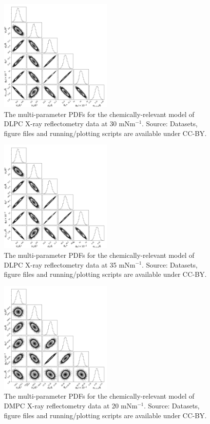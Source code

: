 \documentclass[11pt,a4paper]{paper}
\begin{document}
\begin{figure}[h]
	\centering
	\includegraphics[width=0.50\textwidth]{figures/dlpc3_all_corner}
	\caption{The multi-parameter PDFs for the chemically-relevant model of DLPC X-ray reflectometry data at 30 mNm$^{-1}$. Source: Datasets, figure files and running/plotting scripts are available under CC-BY.\cite{mccluskey_2018}}
	\label{fig:dlpc4}
\end{figure}
\begin{figure}
	\centering
	\includegraphics[width=0.50\textwidth]{figures/dlpc4_all_corner}
	\caption{The multi-parameter PDFs for the chemically-relevant model of DLPC X-ray reflectometry data at 35 mNm$^{-1}$. Source: Datasets, figure files and running/plotting scripts are available under CC-BY.\cite{mccluskey_2018}}
	\label{fig:dlpc5}
\end{figure}
\begin{figure}[h]
	\centering
	\includegraphics[width=0.50\textwidth]{figures/dmpc1_all_corner}
	\caption{The multi-parameter PDFs for the chemically-relevant model of DMPC X-ray reflectometry data at 20 mNm$^{-1}$. Source: Datasets, figure files and running/plotting scripts are available under CC-BY.\cite{mccluskey_2018}}
	\label{fig:dmpc2}
\end{figure}
\end{document}
